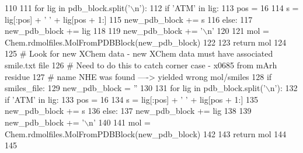 \begin{DoxyCode}
110 
111                 \textcolor{keywordflow}{for} lig \textcolor{keywordflow}{in} pdb\_block.split(\textcolor{stringliteral}{'\(\backslash\)n'}):
112                     \textcolor{keywordflow}{if} \textcolor{stringliteral}{'ATM'} \textcolor{keywordflow}{in} lig:
113                         pos = 16
114                         s = lig[:pos] + \textcolor{stringliteral}{' '} + lig[pos + 1:]
115                         new\_pdb\_block += s
116                     \textcolor{keywordflow}{else}:
117                         new\_pdb\_block += lig
118 
119                     new\_pdb\_block += \textcolor{stringliteral}{'\(\backslash\)n'}
120 
121                 mol = Chem.rdmolfiles.MolFromPDBBlock(new\_pdb\_block)
122 
123                 \textcolor{keywordflow}{return} mol
124 
125         \textcolor{comment}{# Look for new XChem data - new XChem data must have associated smile.txt file}
126         \textcolor{comment}{# Need to do this to catch corner case - x0685 from mArh residue}
127         \textcolor{comment}{# name NHE was found ----> yielded wrong mol/smiles}
128         \textcolor{keywordflow}{if} smiles\_file:
129             new\_pdb\_block = \textcolor{stringliteral}{''}
130 
131             \textcolor{keywordflow}{for} lig \textcolor{keywordflow}{in} pdb\_block.split(\textcolor{stringliteral}{'\(\backslash\)n'}):
132                 \textcolor{keywordflow}{if} \textcolor{stringliteral}{'ATM'} \textcolor{keywordflow}{in} lig:
133                     pos = 16
134                     s = lig[:pos] + \textcolor{stringliteral}{' '} + lig[pos + 1:]
135                     new\_pdb\_block += s
136                 \textcolor{keywordflow}{else}:
137                     new\_pdb\_block += lig
138 
139                 new\_pdb\_block += \textcolor{stringliteral}{'\(\backslash\)n'}
140 
141             mol = Chem.rdmolfiles.MolFromPDBBlock(new\_pdb\_block)
142 
143             \textcolor{keywordflow}{return} mol
144 
145 
\end{DoxyCode}
\mbox{\label{classfragalysis__api_1_1xcimporter_1_1conversion__pdb__mol_1_1_ligand_a9985de5dae739f11768aa6985ccd94bd}} 
